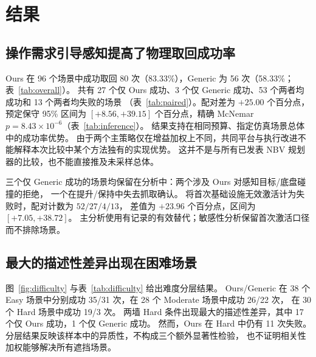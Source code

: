 \section{结果}
\label{sec:results}
\subsection{操作需求引导感知提高了物理取回成功率}
Ours 在 96 个场景中成功取回 80 次（83.33\%），Generic 为 56 次（58.33\%；表~\ref{tab:overall}）。
共有 27 个仅 Ours 成功、3 个仅 Generic 成功、53 个两者均成功和 13 个两者均失败的场景
（表~\ref{tab:paired}）。配对差为 $+25.00$ 个百分点，预定保守 95\% 区间为
$[+8.56,+39.15]$ 个百分点，精确 McNemar $p=8.43\times10^{-6}$（表~\ref{tab:inference}）。
结果支持在相同预算、指定仿真场景总体中的成功率优势。
由于两个主策略仅在增益加权上不同，共同平台与执行改进不能解释本次比较中某个方法独有的实现优势。
这并不是与所有已发表 NBV 规划器的比较，也不能直接推及未采样总体。

\begin{table}[tb]\centering
\caption{共用观测预算下的主要物理取回成功率。}
\label{tab:overall}
\end{table}
\begin{table}[tb]\centering
\caption{全部 96 个独立场景的配对结果。}
\label{tab:paired}
\end{table}
\begin{table}[tb]\centering
\caption{预定配对推断。区间针对 Ours 减 Generic 的成功率差，单位为百分点，不是 $p$ 值区间。}
\label{tab:inference}\resizebox{\linewidth}{!}{}
\end{table}

三个仅 Generic 成功的场景均保留在分析中：两个涉及 Ours 对感知目标/底盘碰撞的拒绝，
一个在提升/保持中失去抓取确认。
将首次基础设施无效激活计为失败时，配对计数为 $52/27/4/13$，
差值为 $+23.96$ 个百分点，区间为 $[+7.05,+38.72]$。
主分析使用有记录的有效替代；敏感性分析保留首次激活口径而不排除场景。

\subsection{最大的描述性差异出现在困难场景}
\label{sec:hard}
图~\ref{fig:difficulty} 与表~\ref{tab:difficulty} 给出难度分层结果。
Ours/Generic 在 38 个 Easy 场景中分别成功 35/31 次，在 28 个 Moderate 场景中成功 26/22 次，
在 30 个 Hard 场景中成功 19/3 次。
两墙 Hard 条件出现最大的描述性差异，其中 17 个仅 Ours 成功，1 个仅 Generic 成功。
然而，Ours 在 Hard 中仍有 11 次失败。
分层结果反映该样本中的异质性，不构成三个额外显著性检验，
也不证明相关性加权能够解决所有遮挡场景。

